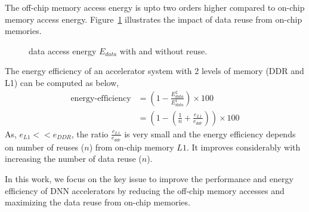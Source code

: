 \documentclass[a4paper,10pt]{article}
\begin{document}
The off-chip memory access energy is upto two orders higher compared to on-chip memory access energy. Figure~\ref{fig:dataAccessEnergy} illustrates the impact of data reuse from on-chip memories. 
\begin{figure}[!htb]
	\centering
	\hfil
	\caption{data access energy $E_{data}$ with and without reuse.}
	\label{fig:dataAccessEnergy}
	\vspace{-1.0em}	
\end{figure}
The energy efficiency of an accelerator system with 2 levels of memory (DDR and L1) can be computed as below,
\begin{align*}
	\text{energy-efficiency} &= (1-\frac{E^2_{data}}{E^1_{data}})\times{100}\\
	&= (1-(\frac{1}{n}+\frac{e_{L1}}{e_{ddr}}))\times{100}
\end{align*}
As, $e_{L1} << e_{DDR}$, the ratio $\frac{e_{L1}}{e_{ddr}}$ is very small and the energy efficiency depends on number of reuses ($n$) from on-chip memory $L1$. It improves considerably with increasing the number of data reuse ($n$). 

In this work, we focus on the key issue to improve the performance and energy efficiency of DNN accelerators by reducing the off-chip memory accesses and maximizing the data reuse from on-chip memories.
\end{document}
